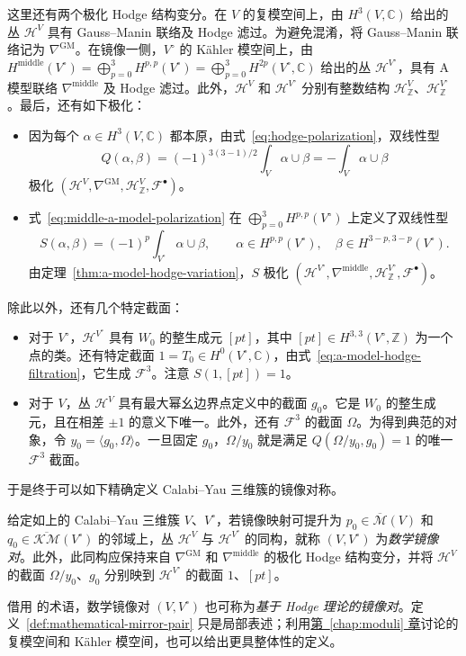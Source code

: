 这里还有两个极化 Hodge 结构变分。在 $V$ 的复模空间上，由 $H^3(V,\mathbb C)$ 给出的丛 $\mathcal H^V$ 具有 Gauss--Manin 联络及 Hodge 滤过。为避免混淆，将 Gauss--Manin 联络记为 $\nabla^{\mathrm{GM}}$。在镜像一侧，$V^\circ$ 的 Kähler 模空间上，由 $H^{\mathrm{middle}}(V^\circ)=\bigoplus_{p=0}^3H^{p,p}(V^\circ)=\bigoplus_{p=0}^3H^{2p}(V^\circ,\mathbb C)$ 给出的丛 $\mathcal H^{V^\circ}$，具有 A 模型联络 $\nabla^{\mathrm{middle}}$ 及 Hodge 滤过。此外，$\mathcal H^V$ 和 $\mathcal H^{V^\circ}$ 分别有整数结构 $\mathcal H^V_{\mathbb Z}$、$\mathcal H^{V^\circ}_{\mathbb Z}$。最后，还有如下极化：
\begin{itemize}
\item 因为每个 $\alpha\in H^3(V,\mathbb C)$ 都本原，由式~\eqref{eq:hodge-polarization}，双线性型
\[
Q(\alpha,\beta)=(-1)^{3(3-1)/2}\int_V\alpha\cup\beta=-\int_V\alpha\cup\beta
\]
极化 $(\mathcal H^V,\nabla^{\mathrm{GM}},\mathcal H^V_{\mathbb Z},\mathcal F^\bullet)$。
\item 式~\eqref{eq:middle-a-model-polarization} 在 $\bigoplus_{p=0}^3H^{p,p}(V^\circ)$ 上定义了双线性型
\[
S(\alpha,\beta)=(-1)^p\int_{V^\circ}\alpha\cup\beta,\qquad
\alpha\in H^{p,p}(V^\circ),\quad\beta\in H^{3-p,3-p}(V^\circ).
\]
由定理~\ref{thm:a-model-hodge-variation}，$S$ 极化 $(\mathcal H^{V^\circ},\nabla^{\mathrm{middle}},\mathcal H^{V^\circ}_{\mathbb Z},\mathcal F^\bullet)$。
\end{itemize}
除此以外，还有几个特定截面：
\begin{itemize}
\item 对于 $V^\circ$，$\mathcal H^{V^\circ}$ 具有 $W_0$ 的整生成元 $[pt]$，其中 $[pt]\in H^{3,3}(V^\circ,\mathbb Z)$ 为一个点的类。还有特定截面 $1=T_0\in H^0(V^\circ,\mathbb C)$，由式~\eqref{eq:a-model-hodge-filtration}，它生成 $\mathcal F^3$。注意 $S(1,[pt])=1$。
\item 对于 $V$，丛 $\mathcal H^V$ 具有最大幂幺边界点定义中的截面 $g_0$。它是 $W_0$ 的整生成元，且在相差 $\pm1$ 的意义下唯一。此外，还有 $\mathcal F^3$ 的截面 $\Omega$。为得到典范的对象，令 $y_0=\langle g_0,\Omega\rangle$。一旦固定 $g_0$，$\Omega/y_0$ 就是满足 $Q(\Omega/y_0,g_0)=1$ 的唯一 $\mathcal F^3$ 截面。
\end{itemize}
于是终于可以如下精确定义 Calabi--Yau 三维簇的镜像对称。
\begin{definition}\label{def:mathematical-mirror-pair}
给定如上的 Calabi--Yau 三维簇 $V$、$V^\circ$，若镜像映射可提升为 $p_0\in\overline{\mathcal M}(V)$ 和 $q_0\in\overline{\mathcal{KM}}(V^\circ)$ 的邻域上，丛 $\mathcal H^V$ 与 $\mathcal H^{V^\circ}$ 的同构，就称 $(V,V^\circ)$ 为\emph{数学镜像对}。此外，此同构应保持来自 $\nabla^{\mathrm{GM}}$ 和 $\nabla^{\mathrm{middle}}$ 的极化 Hodge 结构变分，并将 $\mathcal H^V$ 的截面 $\Omega/y_0$、$g_0$ 分别映到 $\mathcal H^{V^\circ}$ 的截面 $1$、$[pt]$。
\end{definition}
借用  的术语，数学镜像对 $(V,V^\circ)$ 也可称为\emph{基于 Hodge 理论的镜像对}。定义~\ref{def:mathematical-mirror-pair} 只是局部表述；利用\hyperref[chap:moduli]{第~\ref*{chap:moduli} 章}讨论的复模空间和 Kähler 模空间，也可以给出更具整体性的定义。

